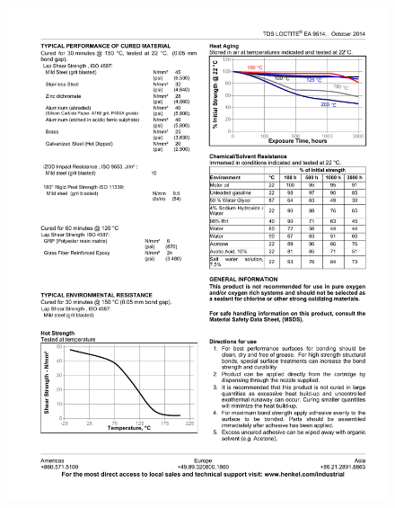 \documentclass[
documentsize = a4, %
font = cmr, %
typesize = 11, %
printmode = true,
onehalfspacing = true,
language = en, %
titlepage = udciccp, %
degree = pt, %
dedication = true,
acknowledgements = true,
abstract-en = true,
abstract-es = false,
abstract-ga = false,
epigraphs = true,
toc = true,
lof = true,
lot = true,
frontmatterintoc = false,
notation = false,
minimal = false,
]{UDCthesis}
\begin{document}
\begin{figure}
	\centering
	\begin{minipage}[b]{.48\linewidth}
		\centering
		\includegraphics[width=\linewidth]{IMG_CUTRES/loctite_hysol_9514_temp_dependency}
	\end{minipage}
	\quad
	\begin{minipage}[b]{.48\linewidth}
		\centering

\end{minipage}
\end{figure}
\end{document}
